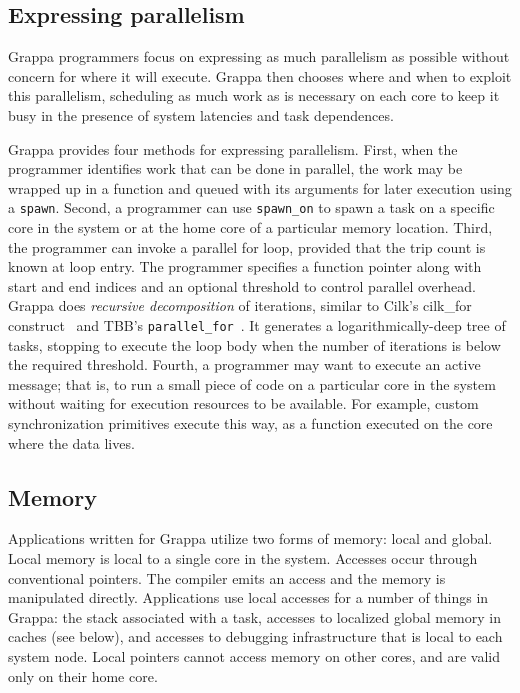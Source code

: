 \subsection{Expressing parallelism}

Grappa programmers focus on expressing as much parallelism as possible without concern for where it will execute. Grappa then chooses where and when to exploit this parallelism, scheduling as much work as is necessary on each core to keep it busy in the presence of system latencies and task dependences.

Grappa provides four methods for expressing parallelism. First, when the programmer identifies work that can be done in parallel, the work may be wrapped up in a function and queued with its arguments for later execution using a \texttt{spawn}. Second, a programmer can use \texttt{spawn\_on} to spawn a task on a specific core in the system or at the home core of a particular memory location. Third, the programmer can invoke a parallel for loop, provided that the trip count is known at loop entry. The programmer specifies a function pointer along with start and end indices and an optional threshold to control parallel overhead. Grappa does {\em recursive decomposition} of iterations, similar to Cilk's cilk\_for construct~\cite {cilkforimplementation} and TBB's {\tt parallel\_for}~\cite{intel_tbb}.  It generates a logarithmically-deep tree of tasks, stopping to execute the loop body when the number of iterations is below the required threshold. Fourth, a programmer may want to execute an active message; that is, to run a small piece of code on a particular core in the system without waiting for execution resources to be available.  For example, custom synchronization primitives execute this way, as a function executed on the core where the data lives.

\subsection{Memory}

Applications written for Grappa utilize two forms of memory: local and global.  Local memory is local to a single core in the system.  Accesses occur through conventional pointers.  The compiler emits an access and the memory is manipulated directly.  Applications use local accesses for a number of things in Grappa: the stack associated with a task, accesses to localized global memory in caches (see below), and accesses to debugging infrastructure that is local to each system node.  Local pointers cannot access memory on other cores, and are valid only on their home core.

